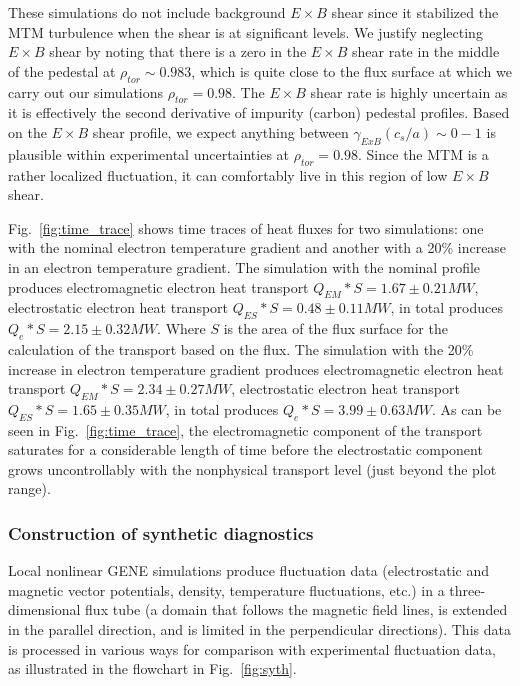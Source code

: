 \documentclass[
 aip,
 amsmath,amssymb,
 reprint
]{revtex4-1}
\begin{document}
These simulations do not include background $E \times B$ shear since it stabilized the MTM turbulence when the shear is at significant levels.  We justify neglecting $E \times B$ shear by noting that there is a zero in the $E \times B$ shear rate in the middle of the pedestal at $\rho_{tor} \sim 0.983$, which is quite close to the flux surface at which we carry out our simulations $\rho_{tor} = 0.98$.  The $E\times B$ shear rate is highly uncertain as it is effectively the second derivative of impurity (carbon) pedestal profiles.  Based on the $E \times B$ shear profile, we expect anything between $\gamma_{ExB}(c_s/a) \sim 0-1$ is plausible within experimental uncertainties at $\rho_{tor}=0.98$.  Since the MTM is a rather localized fluctuation, it can comfortably live in this region of low $E \times B$ shear.  

Fig.~\ref{fig:time_trace} shows time traces of heat fluxes for two simulations: one with the nominal electron temperature gradient and another with a 20\% increase in an electron temperature gradient. The simulation with the nominal profile produces electromagnetic electron heat transport $Q_{EM}*S=1.67\pm0.21MW$, electrostatic electron heat transport $Q_{ES}*S=0.48\pm0.11MW$, in total produces $Q_{e}*S=2.15\pm0.32MW$. Where $S$ is the area of the flux surface for the calculation of the transport based on the flux. The simulation with the  20\% increase in electron temperature gradient produces electromagnetic electron heat transport $Q_{EM}*S=2.34\pm0.27MW$, electrostatic electron heat transport $Q_{ES}*S=1.65\pm0.35MW$, in total produces $Q_{e}*S=3.99\pm0.63MW$. 
As can be seen in Fig.~\ref{fig:time_trace}, the electromagnetic component of the transport saturates for a considerable length of time before the electrostatic component grows uncontrollably with the nonphysical transport level (just beyond the plot range). 

\subsubsection{Construction of synthetic diagnostics}

Local nonlinear GENE simulations produce fluctuation data (electrostatic and magnetic vector potentials, density, temperature fluctuations, etc.) in a three-dimensional flux tube (a domain that follows the magnetic field lines, is extended in the parallel direction, and is limited in the perpendicular directions).  This data is processed in various ways for comparison with experimental fluctuation data, as illustrated in the flowchart in Fig.~\ref{fig:syth}.  
\end{document}
